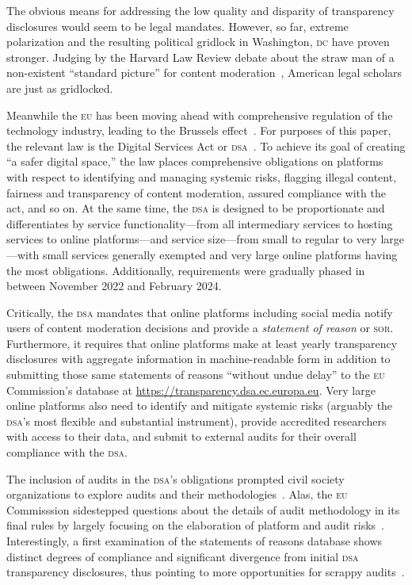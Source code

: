 \documentclass[nonacm,screen]{acmart}
\newcommand\V[1]{\textsc{\MakeLowercase{#1}}}
\begin{document}
The obvious means for addressing the low quality and disparity of transparency
disclosures would seem to be legal mandates. However, so far, extreme
polarization and the resulting political gridlock in Washington, \V{DC} have
proven stronger. Judging by the Harvard Law Review debate about the straw man of
a non-existent ``standard picture'' for content
moderation~\cite{Douek2022,Kadri2022,Klonick2023,MinowMinow2023}, American legal
scholars are just as gridlocked.

Meanwhile the \V{EU} has been moving ahead with comprehensive regulation of the
technology industry, leading to the Brussels effect~\cite{Bradford2020}. For
purposes of this paper, the relevant law is the Digital Services Act or
\V{DSA}~\cite{EuropeanParliamentAndCouncil2022}. To achieve its goal of creating
``a safer digital space,'' the law places comprehensive obligations on platforms
with respect to identifying and managing systemic risks, flagging illegal
content, fairness and transparency of content moderation, assured compliance
with the act, and so on. At the same time, the \V{DSA} is designed to be
proportionate and differentiates by service functionality---from all
intermediary services to hosting services to online platforms---and service
size---from small to regular to very large---with small services generally
exempted and very large online platforms having the most obligations.
Additionally, requirements were gradually phased in between November 2022 and
February 2024.

Critically, the \V{DSA} mandates that online platforms including social media
notify users of content moderation decisions and provide a \emph{statement of
reason} or \V{SoR}. Furthermore, it requires that online platforms make at least
yearly transparency disclosures with aggregate information in machine-readable
form in addition to submitting those same statements of reasons ``without undue
delay'' to the \V{EU} Commission's database at
\url{https://transparency.dsa.ec.europa.eu}. Very large online platforms also
need to identify and mitigate systemic risks (arguably the \V{DSA}'s most
flexible and substantial instrument), provide accredited researchers with access
to their data, and submit to external audits for their overall compliance with
the \V{DSA}.

The inclusion of audits in the \V{DSA}'s obligations prompted civil society
organizations to explore audits and their
methodologies~\cite{ActionCoalitionOnMeaningfulTransparency2023,AdaLovelaceInstitute2021,
BhatiaAllen2023,CostanzaChockRajiea2022,MessmerDegeling2023}. Alas, the \V{EU}
Commisssion sidestepped questions about the details of audit methodology in its
final rules by largely focusing on the elaboration of platform and audit
risks~\cite{EuropeanCommission2023}. Interestingly, a first examination of the
statements of reasons database shows distinct degrees of compliance and
significant divergence from initial \V{DSA} transparency disclosures, thus
pointing to more opportunities for scrappy audits~\cite{TrujilloFagniea2024}.
\end{document}
